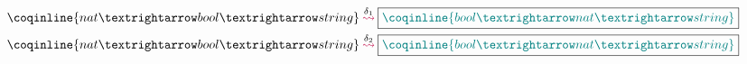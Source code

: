 \documentclass[preview]{standalone}
\begin{document}




\begin{align*}
\MathPatches
{\coqinline{nat → bool → string}}
{\delta_{1}}
{\coqinline{bool → nat → string}}\\
\MathPatches
{\coqinline{nat → bool → string}}
{\delta_{2}}
{\coqinline{bool → nat → string}}
\end{align*}


\end{document}
